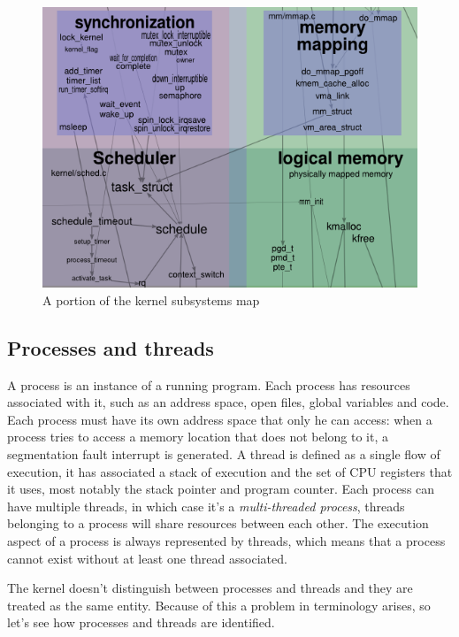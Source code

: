 \documentclass[10pt]{book}
\begin{document}
\begin{figure}[ht]
\includegraphics[width=\textwidth]{images/kernelmap.png}
\caption{A portion of the kernel subsystems map}
\label{img:kernelmap}
\end{figure}

\subsection{Processes and threads} A process is an instance of a running program. Each process has resources associated with it, such as an address space, open files, global variables and code. Each process must have its own address space that only he can access: when a process tries to access a memory location that does not belong to it, a segmentation fault interrupt is generated. A thread is defined as a single flow of execution, it has associated a stack of execution and the set of CPU registers that it uses, most notably the stack pointer and program counter. Each process can have multiple threads, in which case it's a \textit{multi-threaded process}, threads belonging to a process will share resources between each other. The execution aspect of a process is always represented by threads, which means that a process cannot exist without at least one thread associated.

The kernel doesn't distinguish between processes and threads and they are treated as the same entity. Because of this a problem in terminology arises, so let's see how processes and threads are identified.
\end{document}
